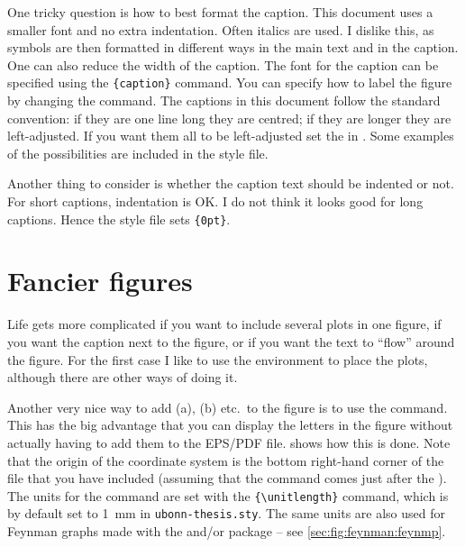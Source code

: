 One tricky question is how to best format the caption. This document
uses a smaller font and no extra indentation. Often italics are
used. I dislike this, as symbols are then formatted in different ways
in the main text and in the caption. One can also reduce the width of
the caption. The font for the caption can be specified using the
\texttt{\{caption\}} command. You can specify how
to label the figure by changing the  command. The
captions in this document follow the standard \KOMAScript{}
convention: if they are one line long they are centred; if they are
longer they are left-adjusted. If you want them all to be
left-adjusted set the 
in . Some examples of the possibilities are
included in the style file.

Another thing to consider is whether the caption text should be indented or
not. For short captions, indentation is OK\@. I do not think it looks
good for long captions. Hence the style file sets
\texttt{\{0pt\}}.

\section{Fancier figures}%
\label{sec:fig:fancy}

Life gets more complicated if you want to include several plots in
one figure, if you want the caption next to the figure, or if you want
the text to \enquote{flow} around the figure. For the first case I like to
use the  environment to place the plots, although
there are other ways of doing it.

Another very nice way to add (a), (b) etc.\ to the figure is to use the
 command. This has the big advantage that you can display
the letters in the figure without actually having to add them to the
EPS/PDF file.  shows how this is done. Note
that the origin of the coordinate system is the bottom right-hand
corner of the file that you have included (assuming that the
 command comes just after the ).
The units for the  command are set with the
\texttt{\{\textbackslash unitlength\}} command, which
is by default set to \qty{1}{\mm} in \texttt{ubonn-thesis.sty}.
The same units are also used for Feynman graphs made with the
 and/or  package -- see
\cref{sec:fig:feynman:feynmp}.

